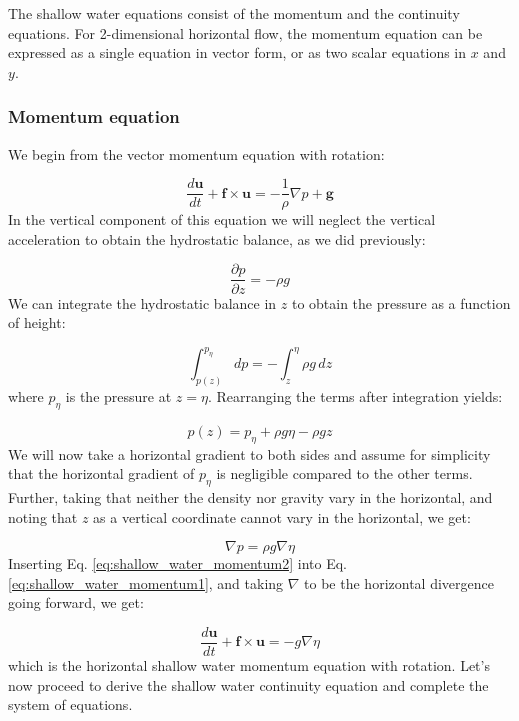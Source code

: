 \documentclass[12pt]{article}
\numberwithin{equation}{section}
\numberwithin{figure}{section}
\numberwithin{table}{section}
\begin{document}
The shallow water equations consist of the momentum and the continuity
equations.
For 2-dimensional horizontal flow, the momentum equation can be expressed as
a single equation in vector form, or as two scalar equations in $x$ and $y$.

\subsubsection{Momentum equation}

We begin from the vector momentum equation with rotation:

\begin{equation}
  \frac{d \mathbf{u}}{dt} + \mathbf{f} \times \mathbf{u} =
  - \frac{1}{\rho} \nabla p + \mathbf{g}
  \label{eq:shallow_water_momentum1}
\end{equation}
In the vertical component of this equation we will neglect the vertical
acceleration to obtain the hydrostatic balance, as we did previously:

\begin{equation}
  \frac{\partial p}{\partial z} = -\rho g
\end{equation}
We can integrate the hydrostatic balance in $z$ to obtain the pressure as a
function of height:

\begin{equation}
  \int_{p(z)}^{p_\eta} dp = - \int_z^\eta \rho g \, dz
\end{equation}
where $p_\eta$ is the pressure at $z = \eta$.
Rearranging the terms after integration yields:

\begin{equation}
  p(z) = p_\eta + \rho g \eta - \rho g z
\end{equation}
We will now take a horizontal gradient to both sides and assume for simplicity
that the horizontal gradient of $p_\eta$ is negligible compared to the other
terms.
Further, taking that neither the density nor gravity vary in the horizontal,
and noting that $z$ as a vertical coordinate cannot vary in the horizontal,
we get:

\begin{equation}
  \nabla p = \rho g \nabla \eta
  \label{eq:shallow_water_momentum2}
\end{equation}
Inserting Eq. \ref{eq:shallow_water_momentum2} into
Eq. \ref{eq:shallow_water_momentum1}, and taking $\nabla$ to be the horizontal
divergence going forward, we get:

\begin{equation}
  \frac{d \mathbf{u}}{dt} + \mathbf{f} \times \mathbf{u} =
  - g \nabla \eta
  \label{eq:shallow_water_momentum3}
\end{equation}
which is the horizontal shallow water momentum equation with rotation.
Let's now proceed to derive the shallow water continuity equation and complete
the system of equations.
\end{document}
